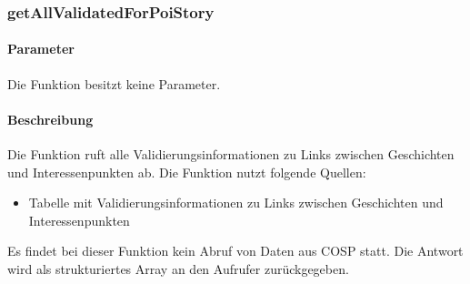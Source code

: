 \subsubsection{getAllValidatedForPoiStory}
\paragraph{Parameter} Die Funktion besitzt keine Parameter.
\paragraph{Beschreibung} Die Funktion ruft alle Validierungsinformationen zu Links zwischen Geschichten und Interessenpunkten ab. Die Funktion nutzt folgende Quellen:
\begin{itemize}
	\item Tabelle mit Validierungsinformationen zu Links zwischen Geschichten und Interessenpunkten
\end{itemize}
Es findet bei dieser Funktion kein Abruf von Daten aus {\glqq COSP\grqq} statt. Die Antwort wird als strukturiertes Array an den Aufrufer zurückgegeben.